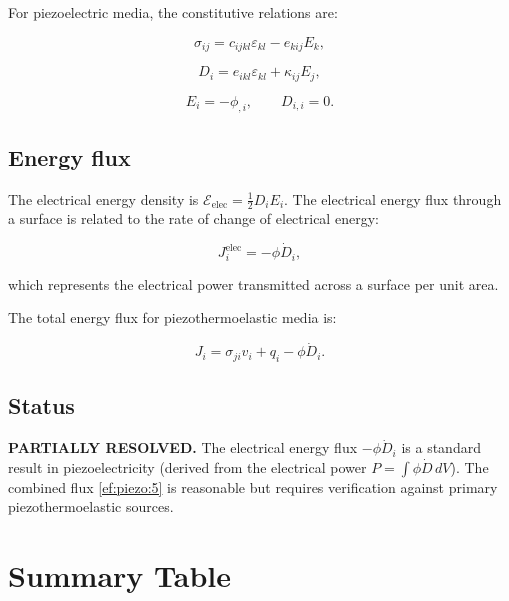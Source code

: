 \documentclass{article}
\begin{document}
For piezoelectric media, the constitutive relations are:

\begin{equation}
\sigma_{ij} = c_{ijkl}\varepsilon_{kl} - e_{kij}E_k,
\label{ef:piezo:1}
\end{equation}

\begin{equation}
D_i = e_{ikl}\varepsilon_{kl} + \kappa_{ij}E_j,
\label{ef:piezo:2}
\end{equation}

\begin{equation}
E_i = -\phi_{,i}, \qquad D_{i,i} = 0.
\label{ef:piezo:3}
\end{equation}

\subsection{Energy flux}

The electrical energy density is $\mathcal{E}_{\text{elec}} = \frac{1}{2}D_iE_i$. The electrical energy flux through a surface is related to the rate of change of electrical energy:

\begin{equation}
J_i^{\text{elec}} = -\phi \dot{D}_i,
\label{ef:piezo:4}
\end{equation}

which represents the electrical power transmitted across a surface per unit area.

The total energy flux for piezothermoelastic media is:

\begin{equation}
J_i = \sigma_{ji}v_i + q_i - \phi\dot{D}_i.
\label{ef:piezo:5}
\end{equation}

\subsection{Status}

\textbf{PARTIALLY RESOLVED.} The electrical energy flux $-\phi\dot{D}_i$ is a standard result in piezoelectricity (derived from the electrical power $P = \int \phi\dot{D} \, dV$). The combined flux \eqref{ef:piezo:5} is reasonable but requires verification against primary piezothermoelastic sources.

\section{Summary Table}
\end{document}
